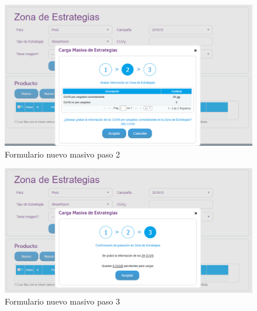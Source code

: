 \documentclass[a4paper,11pt]{paper}
\begin{document}
\begin{figure}[h]
\centering
\includegraphics[width=1.0\textwidth]{imgs/Estrategia/FormularioNuevoMasivo2.png}
\caption{Formulario nuevo masivo paso 2}
\end{figure}

\begin{figure}[h]
\centering
\includegraphics[width=1.0\textwidth]{imgs/Estrategia/FormularioNuevoMasivo3.png}
\caption{Formulario nuevo masivo paso 3}
\end{figure}
\end{document}
